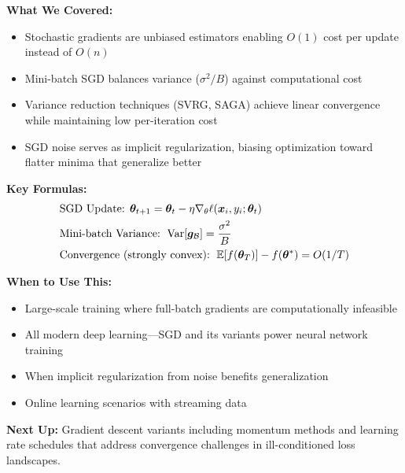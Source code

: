 \documentclass[../../main.tex]{subfiles}
\begin{document}
\begin{chaptersummary}
\textbf{What We Covered:}
\begin{itemize}
    \item Stochastic gradients are unbiased estimators enabling $O(1)$ cost per update instead of $O(n)$
    \item Mini-batch SGD balances variance ($\sigma^2/B$) against computational cost
    \item Variance reduction techniques (SVRG, SAGA) achieve linear convergence while maintaining low per-iteration cost
    \item SGD noise serves as implicit regularization, biasing optimization toward flatter minima that generalize better
\end{itemize}

\textbf{Key Formulas:}
\begin{align*}
    &\text{SGD Update: } \boldsymbol{\theta}_{t+1} = \boldsymbol{\theta}_t - \eta \nabla_\theta \ell(\boldsymbol{x}_i, y_i; \boldsymbol{\theta}_t) \\
    &\text{Mini-batch Variance: } \operatorname{Var}[\boldsymbol{g}_\mathcal{B}] = \frac{\sigma^2}{B} \\
    &\text{Convergence (strongly convex): } \operatorname{\mathbb{E}}[f(\boldsymbol{\theta}_T)] - f(\boldsymbol{\theta}^*) = O(1/T)
\end{align*}

\textbf{When to Use This:}
\begin{itemize}
    \item Large-scale training where full-batch gradients are computationally infeasible
    \item All modern deep learning---SGD and its variants power neural network training
    \item When implicit regularization from noise benefits generalization
    \item Online learning scenarios with streaming data
\end{itemize}

\textbf{Next Up:} Gradient descent variants including momentum methods and learning rate schedules that address convergence challenges in ill-conditioned loss landscapes.
\end{chaptersummary}
\end{document}
